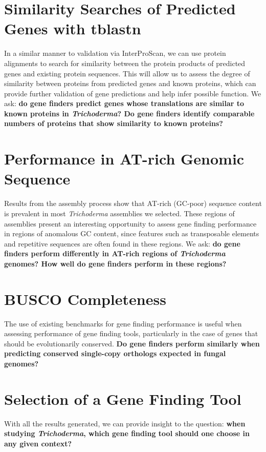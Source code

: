 \section{Similarity Searches of Predicted Genes with tblastn}
\label{rq:tblastn}
In a similar manner to validation via InterProScan, we can use protein alignments to search for similarity between the protein products of predicted genes and existing protein sequences. This will allow us to assess the degree of similarity between proteins from predicted genes and known proteins, which can provide further validation of gene predictions and help infer possible function. We ask: \textbf{do gene finders predict genes whose translations are similar to known proteins in \textit{Trichoderma}? Do gene finders identify comparable numbers of proteins that show similarity to known proteins?}

\section{Performance in AT-rich Genomic Sequence}
\label{rq:anomalous-sequence-content}
Results from the assembly process show that AT-rich (GC-poor) sequence content is prevalent in most \textit{Trichoderma} assemblies we selected. These regions of assemblies present an interesting opportunity to assess gene finding performance
in regions of anomalous GC content, since features such as transposable elements and repetitive sequences are often found in these regions. We ask: \textbf{do gene finders perform differently in AT-rich regions of \textit{Trichoderma} genomes? How well do gene finders perform in these regions?}   

\section{BUSCO Completeness}
\label{rq:busco-completeness}
The use of existing benchmarks for gene finding performance is useful
when assessing performance of gene finding tools, particularly in the
case of genes that should be evolutionarily conserved. \textbf{Do gene
  finders perform similarly when predicting conserved single-copy orthologs expected in fungal
  genomes?}

\section{Selection of a Gene Finding Tool}

With all the results generated, we can provide insight to the
question: \textbf{when studying \textit{Trichoderma}, which gene finding tool should one choose in any given context?}
